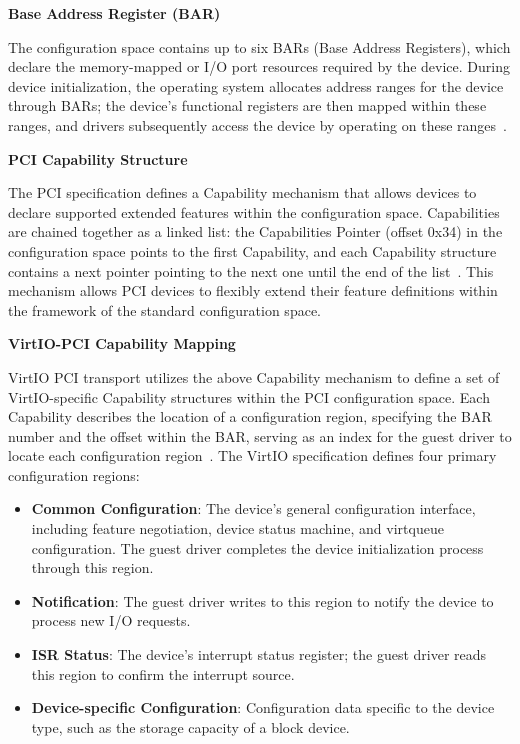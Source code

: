 \begin{ZhChapter}
\noindent\textbf{Base Address Register (BAR)}

The configuration space contains up to six BARs (Base Address Registers), which declare the memory-mapped or I/O port resources required by the device. During device initialization, the operating system allocates address ranges for the device through BARs; the device's functional registers are then mapped within these ranges, and drivers subsequently access the device by operating on these ranges~\cite{PCI30}.

\noindent\textbf{PCI Capability Structure}

The PCI specification defines a Capability mechanism that allows devices to declare supported extended features within the configuration space. Capabilities are chained together as a linked list: the Capabilities Pointer (offset 0x34) in the configuration space points to the first Capability, and each Capability structure contains a next pointer pointing to the next one until the end of the list~\cite{PCI30}. This mechanism allows PCI devices to flexibly extend their feature definitions within the framework of the standard configuration space.

\noindent\textbf{VirtIO-PCI Capability Mapping}

VirtIO PCI transport utilizes the above Capability mechanism to define a set of VirtIO-specific Capability structures within the PCI configuration space. Each Capability describes the location of a configuration region, specifying the BAR number and the offset within the BAR, serving as an index for the guest driver to locate each configuration region~\cite{VirtIO11}. The VirtIO specification defines four primary configuration regions:

\begin{itemize}
    \item \textbf{Common Configuration}: The device's general configuration interface, including feature negotiation, device status machine, and virtqueue configuration. The guest driver completes the device initialization process through this region.
    \item \textbf{Notification}: The guest driver writes to this region to notify the device to process new I/O requests.
    \item \textbf{ISR Status}: The device's interrupt status register; the guest driver reads this region to confirm the interrupt source.
    \item \textbf{Device-specific Configuration}: Configuration data specific to the device type, such as the storage capacity of a block device.
\end{itemize}


\end{ZhChapter}
